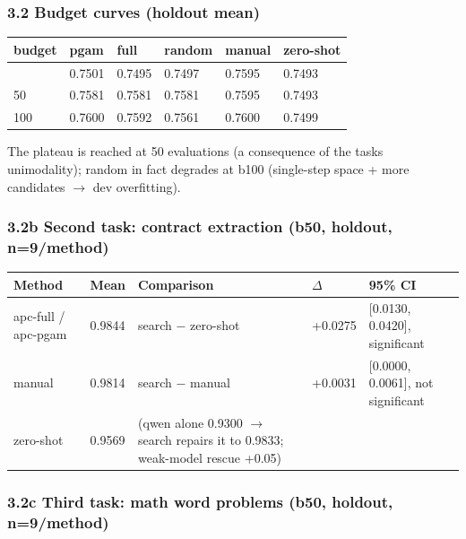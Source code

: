 \subsubsection{3.2 Budget curves (holdout mean)}\label{32-budget-curves-holdout-mean}

\begin{longtable}[]{@{}llllll@{}}
\toprule\noalign{}
budget & pgam & full & random & manual & zero-shot \\
\midrule\noalign{}
\endhead
\bottomrule\noalign{}
\endlastfoot
25 & 0.7501 & 0.7495 & 0.7497 & 0.7595 & 0.7493 \\
50 & 0.7581 & 0.7581 & 0.7581 & 0.7595 & 0.7493 \\
100 & 0.7600 & 0.7592 & 0.7561 & 0.7600 & 0.7499 \\
\end{longtable}

The plateau is reached at 50 evaluations (a consequence of the task\textquotesingle s unimodality); random in fact degrades at b100 (single-step space + more candidates \(\rightarrow\) dev overfitting).

\subsubsection{3.2b Second task: contract extraction (b50, holdout, n=9/method)}\label{32b-second-task-contract-extraction-b50-holdout-n9method}

\begin{longtable}[]{@{}lllll@{}}
\toprule\noalign{}
Method & Mean & Comparison & \(\Delta\) & 95\% CI \\
\midrule\noalign{}
\endhead
\bottomrule\noalign{}
\endlastfoot
apc-full / apc-pgam & 0.9844 & search \(-\) zero-shot & +0.0275 & {[}0.0130, 0.0420{]}, significant \\
manual & 0.9814 & search \(-\) manual & +0.0031 & {[}0.0000, 0.0061{]}, not significant \\
zero-shot & 0.9569 & (qwen alone 0.9300 \(\rightarrow\) search repairs it to 0.9833; weak-model rescue +0.05) & & \\
\end{longtable}

\subsubsection{3.2c Third task: math word problems (b50, holdout, n=9/method)}\label{32c-third-task-math-word-problems-b50-holdout-n9method}

